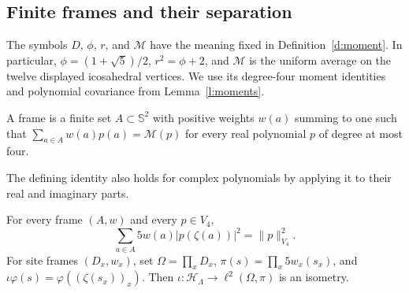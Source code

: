 \subsection{Finite frames and their separation}

The symbols \(D\), \(\phi\), \(r\), and \(\mathcal M\) have the
meaning fixed in Definition~\ref{d:moment}. In particular,
\(\phi=(1+\sqrt5)/2\), \(r^2=\phi+2\), and
\(\mathcal M\) is the uniform average on the twelve displayed
icosahedral vertices. We use its degree-four moment identities and
polynomial covariance from Lemma~\ref{l:moments}.

\begin{definition}\label{d:frame}
A frame is a finite set \(A\subset\mathbb S^2\) with positive weights
\(w(a)\) summing to one such that
\(\sum_{a\in A}w(a)p(a)=\mathcal M(p)\)
for every real polynomial \(p\) of degree at most four.
\end{definition}

The defining identity also holds for complex polynomials by applying
it to their real and imaginary parts.

\begin{lemma}\label{l:tight}
For every frame \((A,w)\) and every \(p\in V_4\),
\[
 \sum_{a\in A}5w(a)|p(\zeta(a))|^2=\|p\|_{V_4}^2.
\]
For site frames \((D_x,w_x)\), set \(\Omega=\prod_xD_x\),
\(\pi(s)=\prod_x5w_x(s_x)\), and
\(\iota\varphi(s)=\varphi((\zeta(s_x))_x)\).
Then \(\iota:\mathcal H_\Lambda\to\ell^2(\Omega,\pi)\) is an isometry.
\end{lemma}


